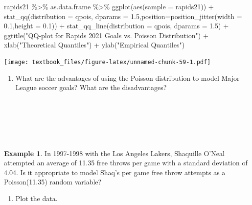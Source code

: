 \documentclass[
  11pt,
]{book}
\newenvironment{Shaded}{\begin{snugshade}}{\end{snugshade}}
\newcommand{\AttributeTok}[1]{\textcolor[rgb]{0.77,0.63,0.00}{#1}}
\newcommand{\FloatTok}[1]{\textcolor[rgb]{0.00,0.00,0.81}{#1}}
\newcommand{\FunctionTok}[1]{\textcolor[rgb]{0.00,0.00,0.00}{#1}}
\newcommand{\NormalTok}[1]{#1}
\newcommand{\SpecialCharTok}[1]{\textcolor[rgb]{0.00,0.00,0.00}{#1}}
\newcommand{\StringTok}[1]{\textcolor[rgb]{0.31,0.60,0.02}{#1}}
\providecommand{\tightlist}{%
  \setlength{\itemsep}{0pt}\setlength{\parskip}{0pt}}
\theoremstyle{definition}
\theoremstyle{definition}
\newtheorem{example}{Example}[chapter]
\theoremstyle{definition}
\theoremstyle{definition}
\theoremstyle{remark}
\begin{document}
\begin{Shaded}
\begin{Highlighting}[]
\NormalTok{rapids21 }\SpecialCharTok{\%\textgreater{}\%} 
\NormalTok{  as.data.frame }\SpecialCharTok{\%\textgreater{}\%} 
  \FunctionTok{ggplot}\NormalTok{(}\FunctionTok{aes}\NormalTok{(}\AttributeTok{sample =}\NormalTok{ rapids21)) }\SpecialCharTok{+}
  \FunctionTok{stat\_qq}\NormalTok{(}\AttributeTok{distribution =}\NormalTok{ qpois,}
          \AttributeTok{dparams =} \FloatTok{1.5}\NormalTok{,}\AttributeTok{position=}\FunctionTok{position\_jitter}\NormalTok{(}\AttributeTok{width =} \FloatTok{0.1}\NormalTok{,}\AttributeTok{height =} \FloatTok{0.1}\NormalTok{)) }\SpecialCharTok{+}
  \FunctionTok{stat\_qq\_line}\NormalTok{(}\AttributeTok{distribution =}\NormalTok{ qpois, }\AttributeTok{dparams =} \FloatTok{1.5}\NormalTok{) }\SpecialCharTok{+}
  \FunctionTok{ggtitle}\NormalTok{(}\StringTok{"QQ{-}plot for Rapids 2021 Goals vs. Poisson Distribution"}\NormalTok{) }\SpecialCharTok{+}
  \FunctionTok{xlab}\NormalTok{(}\StringTok{"Theoretical Quantiles"}\NormalTok{) }\SpecialCharTok{+}
  \FunctionTok{ylab}\NormalTok{(}\StringTok{"Empirical Quantiles"}\NormalTok{)}
\end{Highlighting}
\end{Shaded}

\texttt{[image: textbook\_files/figure-latex/unnamed-chunk-59-1.pdf]}

\begin{enumerate}
\def\labelenumi{(\alph{enumi})}
\setcounter{enumi}{4}
\tightlist
\item
  What are the advantages of using the Poisson distribution to model Major League soccer goals? What are the disadvantages?\\
  \strut \\
  \strut \\
  \strut \\
\end{enumerate}

\newpage

\begin{example}
In 1997-1998 with the Los Angeles Lakers, Shaquille O'Neal attempted an average of 11.35 free throws per game with a standard deviation of 4.04. Is it appropriate to model Shaq's per game free throw attempts as a Poisson(11.35) random variable?
\end{example}

\begin{enumerate}
\def\labelenumi{(\alph{enumi})}
\tightlist
\item
  Plot the data.
\end{enumerate}
\end{document}
